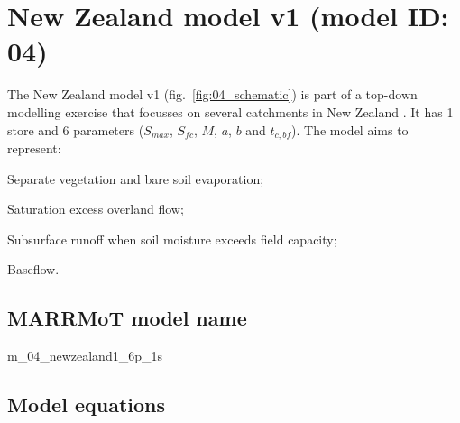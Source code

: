 \section{New Zealand model v1 (model ID: 04)}
The New Zealand model v1 (fig.~\ref{fig:04_schematic}) is part of a top-down modelling exercise that focusses on several catchments in New Zealand \citep{Atkinson2002}. It has 1 store and 6 parameters ($S_{max}$, $S_{fc}$, $M$, $a$, $b$ and $t_{c,bf}$). The model aims to represent:

\begin{itemizecompact}
\item Separate vegetation and bare soil evaporation;
\item Saturation excess overland flow;
\item Subsurface runoff when soil moisture exceeds field capacity;
\item Baseflow.
\end{itemizecompact}

\subsection{MARRMoT model name}
m\_04\_newzealand1\_6p\_1s \\

\subsection{Model equations}

